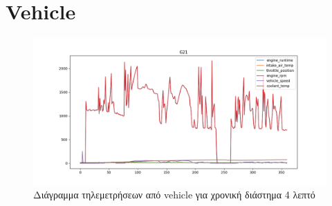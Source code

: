 \documentclass{article}
\begin{document}
\section{Vehicle}

\begin{figure}[H]
  \begin{center}
    \includegraphics[width=\textwidth]{G21.png}
  \end{center}
  \caption{Διάγραμμα τηλεμετρήσεων από vehicle για χρονική διάστημα 4 λεπτό}
\end{figure}
\end{document}
